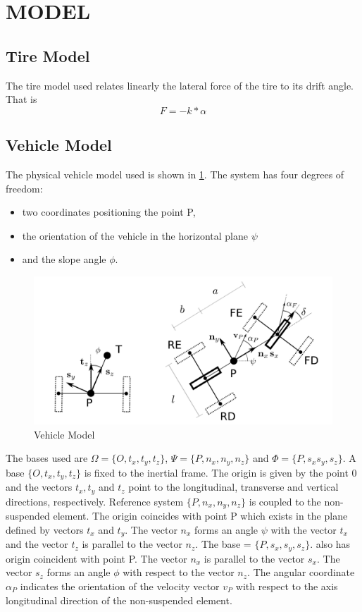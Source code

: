 \documentclass[sublist,a4paper,twoside,11pt]{article}
\begin{document}
\section{MODEL}
\subsection{Tire Model}
The tire model used relates linearly the lateral force of the tire to its drift angle. That is
\begin{equation}
F=-k*\alpha
\end{equation} 

\subsection{Vehicle Model}
The physical vehicle model used is shown in \ref{fig:vehiclemodel}. The system has four degrees of freedom: 
\begin{itemize}
\item two coordinates positioning the point P, 
\item the orientation of the vehicle in the horizontal plane $\psi$ 
\item and the slope angle $\phi$.
\end{itemize}
	
	\begin{figure}
		\centering
		\includegraphics[width=0.7\linewidth]{figures/VehicleModel}
		\caption{Vehicle Model }
		\label{fig:vehiclemodel}
	\end{figure}
	

	
	
The bases used are $\Omega = \{O,t_x, t_y, t_z \}$, $\Psi = \{P, n_x, n_y, n_z \}$ and $\Phi = \{P,s_x s_y,s_z\}$. A base $\{O,t_x, t_y,t_z \}$ is fixed to the inertial frame. The origin is given by the point 0 and the vectors $t_x, t_y$ and $t_z$ point to the longitudinal, transverse and vertical directions, respectively. Reference system $\{P, n_x, n_y, n_z\}$ is coupled to the non-suspended element. The origin coincides with point P which exists in the plane defined by vectors $t_x$ and $t_y$. The vector $n_x$ forms an angle $\psi$ with the vector $t_x$ and the vector $t_z$ is parallel to the vector $n_z$. The base = $\{P,s_x, s_y,s_z\}$. also has origin coincident with point P. The vector $n_x$ is parallel to the vector $s_x$. The vector $s_z$ forms an angle $\phi$ with respect to the vector $n_z$. The angular coordinate $\alpha_P$ indicates the orientation of the velocity vector $v_P$ with respect to the axis longitudinal direction of the non-suspended element.
	
\end{document}

